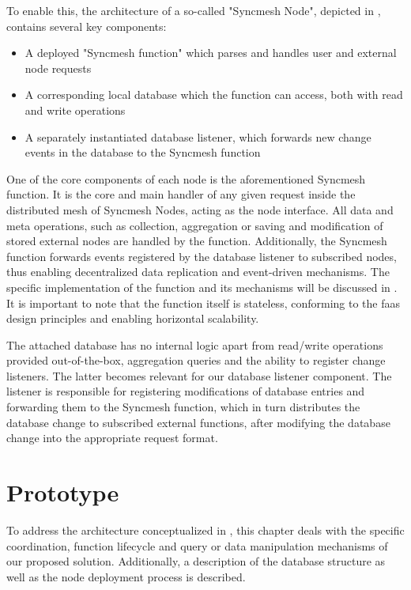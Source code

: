 \documentclass[conference]{IEEEtran}
\begin{document}
To enable this, the architecture of a so-called "Syncmesh Node", depicted in , contains several key components:

\begin{itemize}
    \item A deployed "Syncmesh function" which parses and handles user and external node requests
    \item A corresponding local database which the function can access, both with read and write operations
    \item A separately instantiated database listener, which forwards new change events in the database to the Syncmesh function
\end{itemize}

One of the core components of each node is the aforementioned Syncmesh function. It is the core and main handler of any given request inside the distributed mesh of Syncmesh Nodes, acting as the node interface. All data and meta operations, such as collection, aggregation or saving and modification of stored external nodes are handled by the function. Additionally, the Syncmesh function forwards events registered by the database listener to subscribed nodes, thus enabling decentralized data replication and event-driven mechanisms. The specific implementation of the function and its mechanisms will be discussed in . It is important to note that the function itself is stateless, conforming to the \ac{faas} design principles and enabling horizontal scalability.

The attached database has no internal logic apart from read/write operations provided out-of-the-box, aggregation queries and the ability to register change listeners. The latter becomes relevant for our database listener component. The listener is responsible for registering modifications of database entries and forwarding them to the Syncmesh function, which in turn distributes the database change to subscribed external functions, after modifying the database change into the appropriate request format.

\section{Prototype}\label{Chap:Prototype}
To address the architecture conceptualized in , this chapter deals with the specific coordination, function lifecycle and query or data manipulation mechanisms of our proposed solution. Additionally, a description of the database structure as well as the node deployment process is described.
\end{document}
